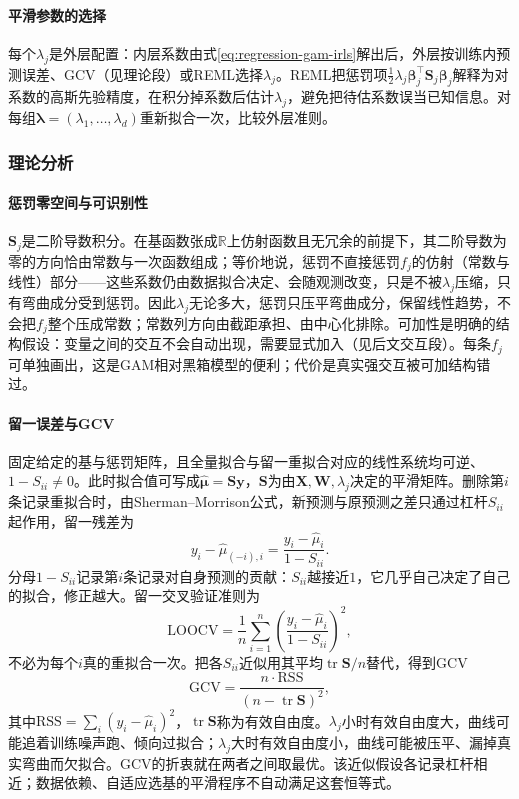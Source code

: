 \paragraph{平滑参数的选择}

每个$\lambda_j$是外层配置：内层系数由式\eqref{eq:regression-gam-irls}解出后，外层按训练内预测误差、GCV（见理论段）或REML选择$\lambda_j$。REML把惩罚项$\frac12\lambda_j\bm{\beta}_j^{\top}\bm{S}_j\bm{\beta}_j$解释为对系数的高斯先验精度，在积分掉系数后估计$\lambda_j$，避免把待估系数误当已知信息。对每组$\bm{\lambda}=(\lambda_1,\ldots,\lambda_d)$重新拟合一次，比较外层准则。

\subsubsection{理论分析}
\label{sec:regression-gam-theory}

\paragraph{惩罚零空间与可识别性}

$\bm{S}_j$是二阶导数积分。在基函数张成$\mathbb R$上仿射函数且无冗余的前提下，其二阶导数为零的方向恰由常数与一次函数组成；等价地说，惩罚不直接惩罚$f_j$的仿射（常数与线性）部分——这些系数仍由数据拟合决定、会随观测改变，只是不被$\lambda_j$压缩，只有弯曲成分受到惩罚。因此$\lambda_j$无论多大，惩罚只压平弯曲成分，保留线性趋势，不会把$f_j$整个压成常数；常数列方向由截距承担、由中心化排除。可加性是明确的结构假设：变量之间的交互不会自动出现，需要显式加入（见后文交互段）。每条$f_j$可单独画出，这是GAM相对黑箱模型的便利；代价是真实强交互被可加结构错过。

\paragraph{留一误差与GCV}

固定给定的基与惩罚矩阵，且全量拟合与留一重拟合对应的线性系统均可逆、$1-S_{ii}\neq0$。此时拟合值可写成$\widehat{\bm{\mu}}=\bm{S}\bm{y}$，$\bm{S}$为由$\bm{X},\bm{W},\lambda_j$决定的平滑矩阵。删除第$i$条记录重拟合时，由Sherman--Morrison公式，新预测与原预测之差只通过杠杆$S_{ii}$起作用，留一残差为
\[
  y_i-\widehat{\mu}_{(-i),i}=\frac{y_i-\widehat\mu_i}{1-S_{ii}}.
\]
分母$1-S_{ii}$记录第$i$条记录对自身预测的贡献：$S_{ii}$越接近$1$，它几乎自己决定了自己的拟合，修正越大。留一交叉验证准则为
\begin{equation}
  \mathrm{LOOCV}=\frac{1}{n}\sum_{i=1}^n
    \left(\frac{y_i-\widehat\mu_i}{1-S_{ii}}\right)^2,
  \label{eq:regression-gam-loocv}
\end{equation}
不必为每个$i$真的重拟合一次。把各$S_{ii}$近似用其平均$\operatorname{tr}\bm{S}/n$替代，得到GCV
\begin{equation}
  \mathrm{GCV}=\frac{n\cdot\mathrm{RSS}}{(n-\operatorname{tr}\bm S)^2},
  \label{eq:regression-gam-gcv}
\end{equation}
其中$\mathrm{RSS}=\sum_i(y_i-\widehat\mu_i)^2$，$\operatorname{tr}\bm S$称为有效自由度。$\lambda_j$小时有效自由度大，曲线可能追着训练噪声跑、倾向过拟合；$\lambda_j$大时有效自由度小，曲线可能被压平、漏掉真实弯曲而欠拟合。GCV的折衷就在两者之间取最优。该近似假设各记录杠杆相近；数据依赖、自适应选基的平滑程序不自动满足这套恒等式。

